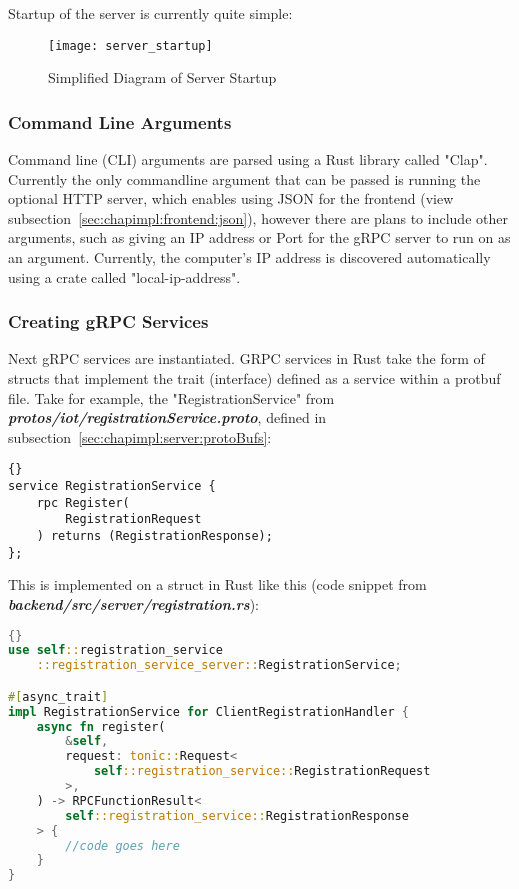 Startup of the server is currently quite simple:

\begin{figure}[h]
\caption{Simplified Diagram of Server Startup}
\texttt{[image: server\_startup]}
\end{figure}

\subsubsection{Command Line Arguments}
Command line (CLI) arguments are parsed using a Rust library called "Clap". Currently the only commandline argument that can be passed is running the optional HTTP server, which enables using JSON for the frontend (view subsection~\ref{sec:chapimpl:frontend:json}), however there are plans to include other arguments, such as giving an IP address or Port for the gRPC server to run on as an argument. Currently, the computer's IP address is discovered automatically using a crate called "local-ip-address". 

\subsubsection{Creating gRPC Services}
Next gRPC services are instantiated. GRPC services in Rust take the form of structs that implement the trait (interface) defined as a service within a protbuf file. Take for example, the "RegistrationService" from \textbf{\textit{protos/iot/registrationService.proto}}, defined in subsection~\ref{sec:chapimpl:server:protoBufs}:
\begin{lstlisting}[language=protobuf3, style=boxed, showstringspaces=false]{}
service RegistrationService {
    rpc Register(
        RegistrationRequest
    ) returns (RegistrationResponse);
};
\end{lstlisting}

This is implemented on a struct in Rust like this (code snippet from \textit{\textbf{backend/src/server/registration.rs}}):
\begin{lstlisting}[language=Rust, style=boxed, showstringspaces=false]{}
use self::registration_service
    ::registration_service_server::RegistrationService;

#[async_trait]
impl RegistrationService for ClientRegistrationHandler {
    async fn register(
        &self,
        request: tonic::Request<
            self::registration_service::RegistrationRequest
        >,
    ) -> RPCFunctionResult<
        self::registration_service::RegistrationResponse
    > {
        //code goes here
    }
}
\end{lstlisting}

